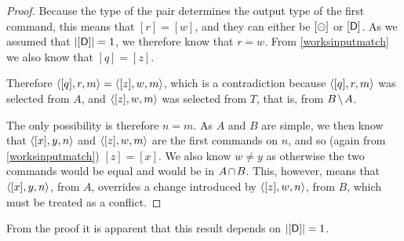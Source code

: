 \begin{proof}
Because the type of the pair determines the output type of the first command,
this means that $[r]=[w]$, and they can either be $[\ominus]$ or $[\mathsf{D}]$.
As we assumed that $|[\mathsf{D}]|=1$, we therefore know that $r=w$.
From \cref{worksinputmatch} we also know that $[q]=[z]$.

Therefore $\langle{[q],r,m}\rangle = \langle{[z],w,m}\rangle$, which is a contradiction
because $\langle{[q],r,m}\rangle$ was selected from $A$, and
$\langle{[z],w,m}\rangle$ was selected from $T$, that is, from $\bmanp$.

The only possibility is therefore $n=m$.
As $A$ and $B$ are simple, we then know that
$\langle{[x],y,n}\rangle$ and $\langle{[z],w,m}\rangle$ are the first commands on $n$,
and so (again from \cref{worksinputmatch}) $[z]=[x]$.
We also know $w\neq y$ as otherwise the two commands would be equal and
would be in $\acbnp$.
This, however, means that $\langle{[x],y,n}\rangle$, from $A$, overrides a change introduced 
by $\langle{[z],w,n}\rangle$, from $B$, which must be treated as a conflict.
\end{proof}

From the proof it is apparent that this result depends on $|[\mathsf{D}]|=1$.
